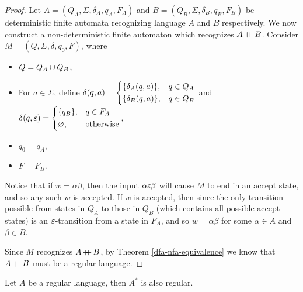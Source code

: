 \begin{proof}
    Let $A = (Q_A, \Sigma, \delta_A, q_A, F_A)$ and $B = (Q_B, \Sigma, \delta_B, q_B, F_B)$ be deterministic finite automata recognizing language $A$ and $B$ respectively. We now construct a non-deterministic finite automaton which recognizes $A \kern-0.2ex+\kern-1.5ex+\kern0.4ex B$. Consider $M = \left(Q, \Sigma, \delta, q_0, F\right)$, where
    \begin{itemize}
        \item $Q = Q_A \cup Q_B$,
        \item For $a \in \Sigma$, define $\delta(q, a) = \begin{dcases}
            \{\delta_A(q, a)\}, &q \in Q_A \\
            \{\delta_B(q, a)\}, &q \in Q_B \\
        \end{dcases}$ and $\delta(q, \varepsilon) = \begin{dcases}
            \{q_B\}, &q \in F_A \\
            \varnothing, &\textrm{otherwise} \\
        \end{dcases}$,
        \item $q_0 = q_A$,
        \item $F = F_B$.
    \end{itemize}
    Notice that if $w = \alpha\beta$, then the input $\alpha\varepsilon\beta$ will cause $M$ to end in an accept state, and so any such $w$ is accepted. If $w$ is accepted, then since the only transition possible from states in $Q_A$ to those in $Q_B$ (which contains all possible accept states) is an $\varepsilon$-transition from a state in $F_A$, and so $w = \alpha\beta$ for some $\alpha \in A$ and $\beta \in B$.

    Since $M$ recognizes $A \kern-0.2ex+\kern-1.5ex+\kern0.4ex B$, by Theorem \ref{dfa-nfa-equivalence} we know that $A \kern-0.2ex+\kern-1.5ex+\kern0.4ex B$ must be a regular language.
\end{proof}

\begin{thm}\label{regular-language-kleene-star}
    Let $A$ be a regular language, then $A^{*}$ is also regular.
\end{thm}


